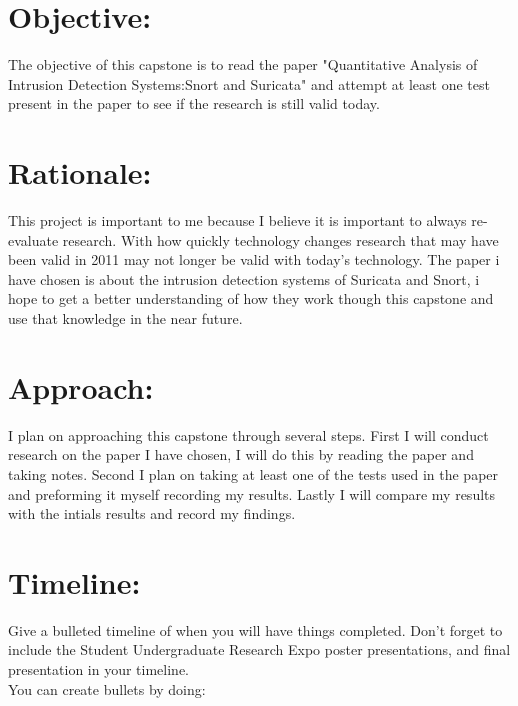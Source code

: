 \documentclass{article}
\begin{document}
    \begin{normalsize}
    
    	\section{Objective:}
        
        The objective of this capstone is to read the paper "Quantitative Analysis of Intrusion Detection Systems:Snort and Suricata" and attempt at least one test present in the paper to see if the research is still valid today.    \\
      
		\section{Rationale:}
        
       This project is important to me because I believe it is important to always re-evaluate research. With how quickly technology changes research that may have been valid  in 2011 may not longer be valid with today's technology.  The paper i have chosen is about the intrusion detection systems of Suricata and Snort, i hope to get a better understanding of how they work though this capstone and use that knowledge in the near future.
        
	   	\section{Approach:}
        
      I plan on approaching this capstone through several steps.  First I will conduct research on the paper I have chosen, I will do this by reading the paper and taking notes. Second I plan on taking at least one of the tests used in the paper and preforming it myself recording my results.  Lastly I will compare my results with the intials results and record my findings.
        
    	\section{Timeline:}
        
        Give a bulleted timeline of when you will have things completed. Don't forget to include the Student Undergraduate Research Expo poster presentations, and final presentation in your timeline. 
        \\
        
        \noindent You can create bullets by doing:
        

\end{normalsize}
\end{document}
